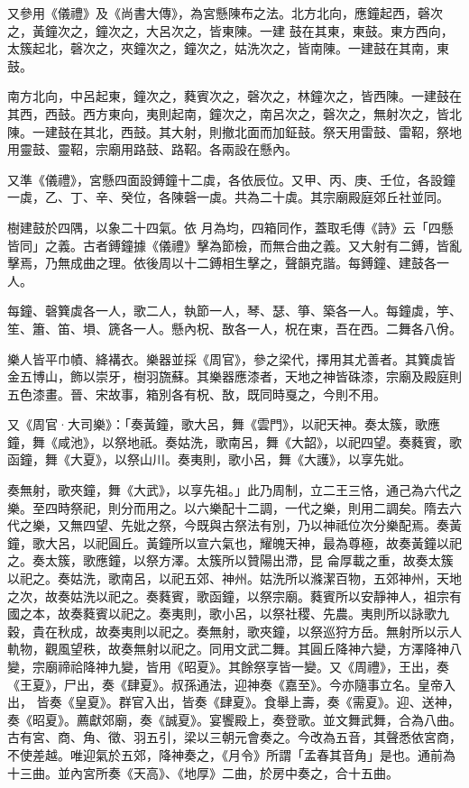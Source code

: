 \begin{pinyinscope}
 又參用《儀禮》及《尚書大傳》，為宮懸陳布之法。北方北向，應鐘起西，磬次之，黃鐘次之，鐘次之，大呂次之，皆東陳。一建
 鼓在其東，東鼓。東方西向，太簇起北，磬次之，夾鐘次之，鐘次之，姑洗次之，皆南陳。一建鼓在其南，東鼓。



 南方北向，中呂起東，鐘次之，蕤賓次之，磬次之，林鐘次之，皆西陳。一建鼓在其西，西鼓。西方東向，夷則起南，鐘次之，南呂次之，磬次之，無射次之，皆北陳。一建鼓在其北，西鼓。其大射，則撤北面而加鉦鼓。祭天用雷鼓、雷鞀，祭地用靈鼓、靈鞀，宗廟用路鼓、路鞀。各兩設在懸內。



 又準《儀禮》，宮懸四面設鎛鐘十二虡，各依辰位。又甲、丙、庚、壬位，各設鐘一虡，乙、丁、辛、癸位，各陳磬一虡。共為二十虡。其宗廟殿庭郊丘社並同。



 樹建鼓於四隅，以象二十四氣。依
 月為均，四箱同作，蓋取毛傳《詩》云「四懸皆同」之義。古者鎛鐘據《儀禮》擊為節檢，而無合曲之義。又大射有二鎛，皆亂擊焉，乃無成曲之理。依後周以十二鎛相生擊之，聲韻克諧。每鎛鐘、建鼓各一人。



 每鐘、磬簨虡各一人，歌二人，執節一人，琴、瑟、箏、築各一人。每鐘虡，竽、笙、簫、笛、塤、篪各一人。懸內柷、敔各一人，柷在東，吾在西。二舞各八佾。



 樂人皆平巾幘、絳褠衣。樂器並採《周官》，參之梁代，擇用其尤善者。其簨虡皆金五博山，飾以崇牙，樹羽旒蘇。其樂器應漆者，天地之神皆硃漆，宗廟及殿庭則五色漆畫。晉、宋故事，箱別各有柷、敔，既同時戛之，今則不用。



 又《周官·大司樂》：「奏黃鐘，歌大呂，舞《雲門》，以祀天神。奏太簇，歌應鐘，舞《咸池》，以祭地祇。奏姑洗，歌南呂，舞《大韶》，以祀四望。奏蕤賓，歌函鐘，舞《大夏》，以祭山川。奏夷則，歌小呂，舞《大護》，以享先妣。



 奏無射，歌夾鐘，舞《大武》，以享先祖。」此乃周制，立二王三恪，通己為六代之樂。至四時祭祀，則分而用之。以六樂配十二調，一代之樂，則用二調矣。隋去六代之樂，又無四望、先妣之祭，今既與古祭法有別，乃以神祗位次分樂配焉。奏黃鐘，歌大呂，以祀圓丘。黃鐘所以宣六氣也，耀魄天神，最為尊極，故奏黃鐘以祀之。奏太簇，歌應鐘，以祭方澤。太簇所以贊陽出滯，昆
 侖厚載之重，故奏太簇以祀之。奏姑洗，歌南呂，以祀五郊、神州。姑洗所以滌潔百物，五郊神州，天地之次，故奏姑洗以祀之。奏蕤賓，歌函鐘，以祭宗廟。蕤賓所以安靜神人，祖宗有國之本，故奏蕤賓以祀之。奏夷則，歌小呂，以祭社稷、先農。夷則所以詠歌九穀，貴在秋成，故奏夷則以祀之。奏無射，歌夾鐘，以祭巡狩方岳。無射所以示人軌物，觀風望秩，故奏無射以祀之。同用文武二舞。其圓丘降神六變，方澤降神八變，宗廟禘祫降神九變，皆用《昭夏》。其餘祭享皆一變。又《周禮》，王出，奏《王夏》，尸出，奏《肆夏》。叔孫通法，迎神奏《嘉至》。今亦隨事立名。皇帝入出，
 皆奏《皇夏》。群官入出，皆奏《肆夏》。食舉上壽，奏《需夏》。迎、送神，奏《昭夏》。薦獻郊廟，奏《誠夏》。宴饗殿上，奏登歌。並文舞武舞，合為八曲。古有宮、商、角、徵、羽五引，梁以三朝元會奏之。今改為五音，其聲悉依宮商，不使差越。唯迎氣於五郊，降神奏之，《月令》所謂「孟春其音角」是也。通前為十三曲。並內宮所奏《天高》、《地厚》二曲，於房中奏之，合十五曲。




\end{pinyinscope}
